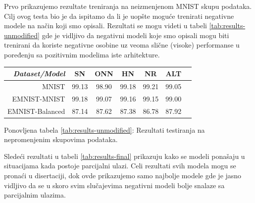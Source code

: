 Prvo prikazujemo rezultate treniranja na neizmenjenom MNIST skupu podataka. Cilj ovog testa bio je da ispitamo da li je uopšte moguće trenirati negativne modele na način koji smo opisali. Rezultati se mogu videti u tabeli \ref{tab:results-unmodified} gde je vidljivo da negativni modeli koje smo opisali mogu biti trenirani da koriste negativne osobine uz veoma slične (visoke) performanse u poređenju sa pozitivnim modelima iste arhitekture.

\begin{table}[ht]
  \centering
  \begin{tabular}{rS[table-format=2.1]S[table-format=2.1]S[table-format=2.1]S[table-format=2.1]S[table-format=2.1]S[table-format=2.1]}
    \toprule
     \textit{Dataset/Model} & SN & ONN & HN & NR & ALT \\
    \midrule
    {MNIST} & {99.13} & {98.90} & {99.18} & {99.21} & {99.05} \\
    {EMNIST-MNIST} & {99.18} & {99.07} & {99.16} & {99.15} & {99.00} \\
    {EMNIST-Balanced} & {87.14} & {87.62} & {87.38} & {86.78} & {87.92} \\
    
    \bottomrule
  \end{tabular}
  {\vskip 0cm Ponovljena tabela \ref{tab:results-unmodified}: Rezultati testiranja na nepromenjenim skupovima podataka.}
\end{table} 

Sledeći rezultati u tabeli \ref{tab:results-final} prikazuju kako se modeli ponašaju u situacijama kada postoje parcijalni ulazi. Celi rezultati svih modela mogu se pronaći u disertaciji, dok ovde prikazujemo samo najbolje modele gde je jasno vidljivo da se u skoro svim slučajevima negativni modeli bolje snalaze sa parcijalnim ulazima.

